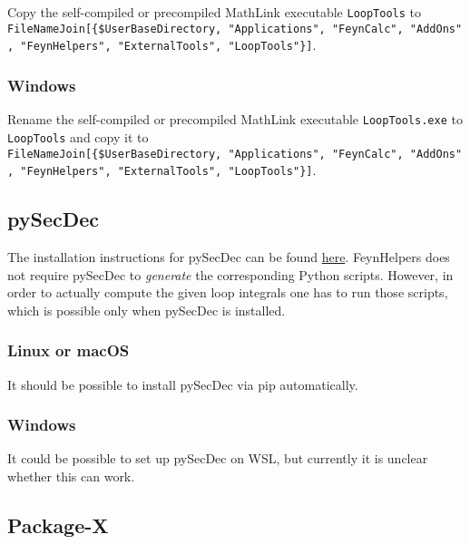 \documentclass[../FeynHelpersManual.tex]{subfiles}
\begin{document}
Copy the self-compiled or precompiled MathLink executable
\texttt{LoopTools} to
\texttt{FileNameJoin[\allowbreak{}\{\allowbreak{}\$UserBaseDirectory,\ \allowbreak{}"Applications",\ \allowbreak{}"FeynCalc",\ \allowbreak{}"AddOns",\ \allowbreak{}"FeynHelpers",\ \allowbreak{}"ExternalTools",\ \allowbreak{}"LoopTools"\}]}.

\hypertarget{windows-2}{%
\subsubsection{Windows}\label{windows-2}}

Rename the self-compiled or precompiled MathLink executable
\texttt{LoopTools.exe} to \texttt{LoopTools} and copy it to
\texttt{FileNameJoin[\allowbreak{}\{\allowbreak{}\$UserBaseDirectory,\ \allowbreak{}"Applications",\ \allowbreak{}"FeynCalc",\ \allowbreak{}"AddOns",\ \allowbreak{}"FeynHelpers",\ \allowbreak{}"ExternalTools",\ \allowbreak{}"LoopTools"\}]}.

\hypertarget{pysecdec}{%
\subsection{pySecDec}\label{pysecdec}}

The installation instructions for pySecDec can be found
\href{https://secdec.readthedocs.io/en/stable/installation.html\#download-the-program-and-install}{here}.
FeynHelpers does not require pySecDec to \emph{generate} the
corresponding Python scripts. However, in order to actually compute the
given loop integrals one has to run those scripts, which is possible
only when pySecDec is installed.

\hypertarget{linux-or-macos-1}{%
\subsubsection{Linux or macOS}\label{linux-or-macos-1}}

It should be possible to install pySecDec via pip automatically.

\hypertarget{windows-3}{%
\subsubsection{Windows}\label{windows-3}}

It could be possible to set up pySecDec on WSL, but currently it is
unclear whether this can work.

\hypertarget{package-x}{%
\subsection{Package-X}\label{package-x}}
\end{document}
